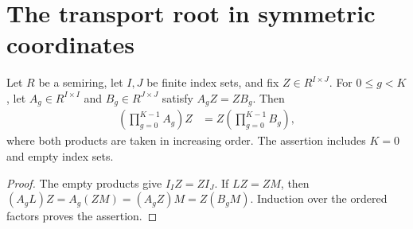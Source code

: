 \section{The transport root in symmetric coordinates}

\begin{theorem}
    \label{thm:matrix_ordered_product_intertwining}
    \leanok
    Let $R$ be a semiring, let $I,J$ be finite index sets, and fix
    $Z\in R^{I\times J}$. For $0\leq g<K$, let
    $A_g\in R^{I\times I}$ and $B_g\in R^{J\times J}$ satisfy
    $A_gZ=ZB_g$. Then
    \begin{align*}
        \left(\prod_{g=0}^{K-1}A_g\right)Z
        & = Z\left(\prod_{g=0}^{K-1}B_g\right),
    \end{align*}
    where both products are taken in increasing order. The assertion
    includes $K=0$ and empty index sets.
\end{theorem}
\begin{proof}
    \leanok
    The empty products give $I_IZ=ZI_J$. If $LZ=ZM$, then
    $(A_gL)Z=A_g(ZM)=(A_gZ)M=Z(B_gM)$. Induction over the ordered
    factors proves the assertion.
\end{proof}

